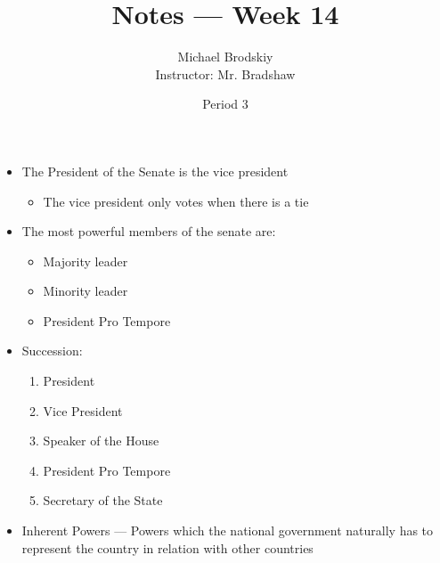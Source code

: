 \documentclass[12pt]{article}
\title{Notes — Week 14}
\date{Period 3}
\author{Michael Brodskiy\\ \small Instructor: Mr. Bradshaw}
\begin{document}
\maketitle

\begin{itemize}

  \item The President of the Senate is the vice president

    \begin{itemize}

      \item The vice president only votes when there is a tie

    \end{itemize}

  \item The most powerful members of the senate are:

    \begin{itemize}

      \item Majority leader

      \item Minority leader

      \item President Pro Tempore

    \end{itemize}

  \item Succession:

    \begin{enumerate}

      \item President

      \item Vice President

      \item Speaker of the House

      \item President Pro Tempore

      \item Secretary of the State

    \end{enumerate}

  \item Inherent Powers — Powers which the national government naturally has to represent the country in relation with other countries

    \begin{itemize}


\end{itemize}
\end{itemize}
\end{document}
